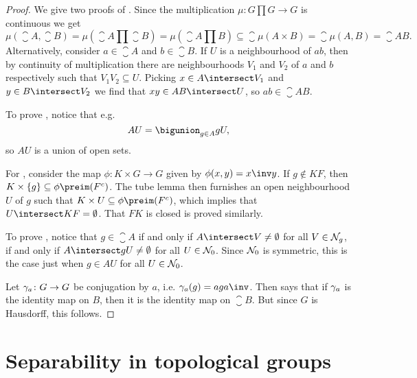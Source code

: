 \documentclass[article, a4paper, 11pt, oneside]{memoir}
\numberwithin{equation}{chapter}
\begin{document}
\begin{proof}
    We give two proofs of . Since the multiplication $\mu \colon G \prod G \to G$ is continuous we get
    \begin{equation*}
        \mu(\closure{A}, \closure{B})
            = \mu(\closure{A} \prod \closure{B})
            = \mu(\closure{A \prod B})
            \subseteq \closure{\mu(A \times B)}
            = \closure{\mu(A, B)}
            = \closure{AB}.
    \end{equation*}
    Alternatively, consider $a \in \closure{A}$ and $b \in \closure{B}$. If $U$ is a neighbourhood of $ab$, then by continuity of multiplication there are neighbourhoods $V_1$ and $V_2$ of $a$ and $b$ respectively such that $V_1 V_2 \subseteq U$. Picking $x \in A \intersect V_1$ and $y \in B \intersect V_2$ we find that $xy \in AB \intersect U$, so $ab \in \closure{AB}$.

    To prove , notice that e.g.
    \begin{equation*}
        AU = \bigunion_{g \in A} gU,
    \end{equation*}
    so $AU$ is a union of open sets.

    For , consider the map $\phi \colon K \times G \to G$ given by $\phi(x,y) = x\inv y$. If $g \not\in KF$, then $K \times \{g\} \subseteq \phi\preim(F^c)$. The tube lemma then furnishes an open neighbourhood $U$ of $g$ such that $K \times U \subseteq \phi\preim(F^c)$, which implies that $U \intersect KF = \emptyset$. That $FK$ is closed is proved similarly.

    To prove , notice that $g \in \closure{A}$ if and only if $A \intersect V \neq \emptyset$ for all $V \in \mathcal{N}_{g}$, if and only if $A \intersect gU \neq \emptyset$ for all $U \in \mathcal{N}_{0}$. Since $\mathcal{N}_{0}$ is symmetric, this is the case just when $g \in AU$ for all $U \in \mathcal{N}_{0}$.

    Let $\gamma_a \colon G \to G$ be conjugation by $a$, i.e. $\conjmult_a(g) = aga\inv$. Then  says that if $\gamma_a$ is the identity map on $B$, then it is the identity map on $\closure{B}$. But since $G$ is Hausdorff, this follows.
\end{proof}


\section{Separability in topological groups}
\end{document}
